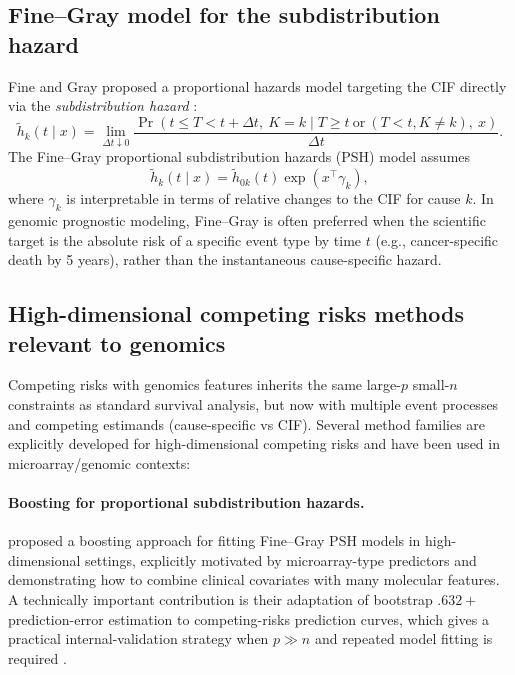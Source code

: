 \documentclass[11pt]{article}
\begin{document}
\subsection{Fine--Gray model for the subdistribution hazard}\label{sec:fine-gray}
Fine and Gray proposed a proportional hazards model targeting the CIF directly via the \emph{subdistribution hazard} \citep{FineGray1999}:
\begin{equation}
\tilde h_k(t\mid x)
=
\lim_{\Delta t\downarrow 0}\frac{\Pr(t\le T<t+\Delta t,\ K=k\mid T\ge t\ \text{or}\ (T<t, K\ne k),\ x)}{\Delta t}.
\label{eq:fg_subhaz}
\end{equation}
The Fine--Gray proportional subdistribution hazards (PSH) model assumes
\begin{equation}
\tilde h_k(t\mid x)=\tilde h_{0k}(t)\exp(x^\top\gamma_k),
\label{eq:fg_ph}
\end{equation}
where \(\gamma_k\) is interpretable in terms of relative changes to the CIF for cause \(k\).
In genomic prognostic modeling, Fine--Gray is often preferred when the scientific target is the absolute risk of a specific event type by time \(t\) (e.g., cancer-specific death by 5 years), rather than the instantaneous cause-specific hazard.

\subsection{High-dimensional competing risks methods relevant to genomics}\label{sec:high-dimensional-methods}
Competing risks with genomics features inherits the same large-$p$ small-$n$ constraints as standard survival analysis, but now with multiple event processes and competing estimands (cause-specific vs CIF). Several method families are explicitly developed for high-dimensional competing risks and have been used in microarray/genomic contexts:

\paragraph{Boosting for proportional subdistribution hazards.}
\citet{Binder2009} proposed a boosting approach for fitting Fine--Gray PSH models in high-dimensional settings, explicitly motivated by microarray-type predictors and demonstrating how to combine clinical covariates with many molecular features. A technically important contribution is their adaptation of bootstrap $.632+$ prediction-error estimation to competing-risks prediction curves, which gives a practical internal-validation strategy when $p \gg n$ and repeated model fitting is required \citep{Binder2009}.
\end{document}
